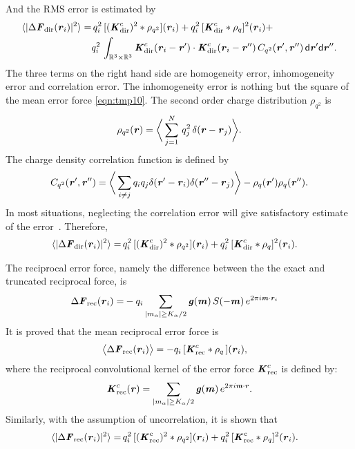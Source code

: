 \documentclass[aps,pre,preprint]{revtex4-1}
\renewcommand{\v}[1]{\textbf{\textit{#1}}}
\renewcommand{\d}[1]{\textsf{#1}}
\begin{document}
And the RMS error is estimated by
\begin{align}\nonumber
  \langle\vert\Delta\v F_{\textrm{dir}}(\v r_i)\vert^2\rangle
  = &\,
  q_i^2\,[(\v K^c_{\textrm{dir}})^2\ast\rho_{q^2}] (\v r_i) + 
  q_i^2\,[\v K^c_{\textrm{dir}}\ast\rho_{q}]^2 (\v r_i) + \\
  &
  q_i^2\,\int_{\mathbb R^3\times\mathbb R^3}
  \v K^c_{\textrm{dir}}(\v r_i-\v r')\cdot
  \v K^c_{\textrm{dir}}(\v r_i-\v r'')\,
  C_{q^2}(\v r', \v r'')\,
  \d d\v r'\d d\v r''.
\end{align}
The three terms on the right hand side are homogeneity error,
inhomogeneity error and correlation error. The inhomogeneity error is
nothing but the square of the mean error force \eqref{eqn:tmp10}. The
second order charge distribution $\rho_{q^2}$ is
\begin{align}
  \rho_{q^2}(\v r) = 
  \bigg\langle
  \sum_{j = 1}^N
  \,q^2_j\,\delta(\v r - \v r_j)
  \bigg\rangle.
\end{align}
The charge density correlation function is defined by
\begin{align}
  C_{q^2}(\v r', \v r'')
  =
  \bigg\langle
  \sum_{i\neq j}q_iq_j\delta(\v r'-\v r_i)\delta(\v r''-\v r_j)
  \bigg\rangle
  - \rho_q(\v r')\rho_q(\v r'').
\end{align}
In most situations, neglecting the correlation error will give
satisfactory estimate of the error~\cite{short}. Therefore, 
\begin{align}
  \langle\vert\Delta\v F_{\textrm{dir}}(\v r_i)\vert^2\rangle
  = &\,
  q_i^2\,[(\v K^c_{\textrm{dir}})^2\ast\rho_{q^2}] (\v r_i) + 
  q_i^2\,[\v K^c_{\textrm{dir}}\ast\rho_{q}]^2 (\v r_i).
\end{align}


The reciprocal error force, namely the difference between the
the exact and truncated reciprocal force, is
\begin{align}
  \Delta \v F_{\textrm{rec}}(\v r_i)
  = & - 
  q_i
  \sum_{\vert m_\alpha\vert \geq K_\alpha/2}
  \v g(\v m) \,
  S(-\v m)\,
  e^{2\pi i\v m\cdot\v r_i} 
\end{align}
It is proved that the mean reciprocal error force is
\begin{align}\label{eqn:tmp18}
  \big\langle
  \Delta \v F_{\textrm{rec}}(\v r_i)
  \big\rangle
  &= 
  -q_i\,[\v K^c_{\textrm{rec}}\ast\rho_q\,] (\v r_i),
\end{align}
where the reciprocal convolutional kernel of the error force $\v
K^c_{\textrm{rec}}$ is defined by:
\begin{align}
  \v K^c_{\textrm{rec}}(\v r) =
  \sum_{
      \vert m_\alpha\vert \geq K_\alpha/2}
  \v g(\v m) \,
  e^{2\pi i\v m\cdot\v r}.
\end{align}
Similarly, with the assumption of uncorrelation, it is shown that
\begin{align}
  \langle\vert\Delta\v F_{\textrm{rec}}(\v r_i)\vert^2\rangle
  = &\,
  q_i^2\,[(\v K^c_{\textrm{rec}})^2\ast\rho_{q^2}] (\v r_i) + 
  q_i^2\,[\v K^c_{\textrm{rec}}\ast\rho_{q}]^2 (\v r_i).
\end{align}
\end{document}
